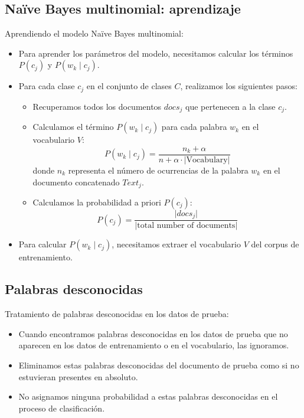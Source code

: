 \documentclass[11pt,fleqn]{book} %
\begin{document}
\subsection{Naïve Bayes multinomial: aprendizaje}

Aprendiendo el modelo Naïve Bayes multinomial:
\begin{itemize}
    \item Para aprender los parámetros del modelo, necesitamos calcular los términos $P(c_j)$ y $P(w_k \mid c_j)$.
    \item Para cada clase $c_j$ en el conjunto de clases $C$, realizamos los siguientes pasos:
    \begin{itemize}
        \item Recuperamos todos los documentos $docs_j$ que pertenecen a la clase $c_j$.
        \item Calculamos el término $P(w_k \mid c_j)$ para cada palabra $w_k$ en el vocabulario $V$:
        \[
        P(w_k \mid c_j) = \frac{{n_k + \alpha}}{{n + \alpha \cdot \lvert \text{Vocabulary} \rvert}}
        \]
        donde $n_k$ representa el número de ocurrencias de la palabra $w_k$ en el documento concatenado $Text_j$.
        \item Calculamos la probabilidad a priori $P(c_j)$:
        \[
        P(c_j) = \frac{{\lvert docs_j \rvert}}{{\lvert \text{total number of documents} \rvert}}
        \]
    \end{itemize}
    \item Para calcular $P(w_k \mid c_j)$, necesitamos extraer el vocabulario $V$ del corpus de entrenamiento.
\end{itemize}

\subsection{Palabras desconocidas}

Tratamiento de palabras desconocidas en los datos de prueba:
\begin{itemize}
    \item Cuando encontramos palabras desconocidas en los datos de prueba que no aparecen en los datos de entrenamiento o en el vocabulario, las ignoramos.
    \item Eliminamos estas palabras desconocidas del documento de prueba como si no estuvieran presentes en absoluto.
    \item No asignamos ninguna probabilidad a estas palabras desconocidas en el proceso de clasificación.
\end{itemize}
\end{document}
